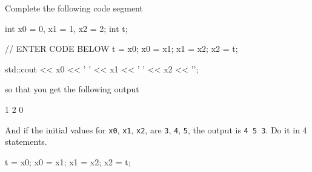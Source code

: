 \nextq
Complete the following code segment
\begin{console}[fontsize=\footnotesize]
int x0 = 0, x1 = 1, x2 = 2;
int t;

// ENTER CODE BELOW
t = x0;
x0 = x1;
x1 = x2;
x2 = t;

std::cout << x0 << ' ' << x1 << ' ' << x2 << '\n';
\end{console}
so that you get the following output
\begin{console}[fontsize=\footnotesize]
1 2 0
\end{console}
And if the initial values for
\verb!x0!,
\verb!x1!,
\verb!x2!,
are
\verb!3!,
\verb!4!,
\verb!5!,
the output is \verb!4 5 3!.
Do it in 4 statements.
\\
\ANSWER
\begin{answercode}
t = x0;
x0 = x1;
x1 = x2;
x2 = t;
\end{answercode}


